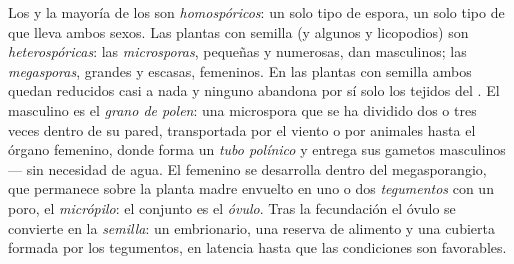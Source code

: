 \begin{definition}\label{def:b2:plant-life-cycles:heterospory}
Los  y la mayoría de los  son \emph{homospóricos}: un solo
tipo de espora, un solo tipo de  que lleva ambos sexos. Las
plantas con semilla (y algunos  y licopodios) son
\emph{heterospóricas}: las \emph{microsporas}, pequeñas y numerosas, dan
 masculinos; las \emph{megasporas}, grandes y escasas,
 femeninos. En las plantas con semilla ambos quedan reducidos
casi a nada y ninguno abandona por sí solo los tejidos del . El
 masculino es el \emph{grano de polen}: una microspora que se ha
dividido dos o tres veces dentro de su pared, transportada por el viento
o por animales hasta el órgano femenino, donde forma un \emph{tubo
polínico} y entrega sus gametos masculinos --- sin necesidad de agua. El
 femenino se desarrolla dentro del megasporangio, que permanece
sobre la planta madre envuelto en uno o dos \emph{tegumentos} con un
poro, el \emph{micrópilo}: el conjunto es el \emph{óvulo}. Tras la
fecundación el óvulo se convierte en la \emph{semilla}: un 
embrionario, una reserva de alimento y una cubierta formada por los
tegumentos, en latencia hasta que las condiciones son favorables.
\end{definition}

